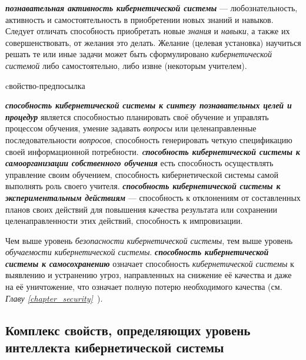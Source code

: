 \textbf{\textit{познавательная активность кибернетической системы}} --- любознательность, активность и самостоятельность в приобретении новых знаний и навыков. Следует отличать способность приобретать новые \textit{знания} и \textit{навыки}, а также их совершенствовать, от желания это делать. Желание (целевая установка) научиться решать те или иные задачи может быть сформулировано \textit{кибернетической системой} либо самостоятельно, либо извне (некоторым учителем).

\begin{SCn}
\begin{scnrelfromlist}{cвойство-предпосылка}
\end{scnrelfromlist}
\end{SCn}

\textbf{\textit{способность кибернетической системы к синтезу познавательных целей и процедур}} является способностью планировать своё обучение и управлять процессом обучения, умение задавать \textit{вопросы} или целенаправленные последовательности \textit{вопросов}, способность генерировать четкую спецификацию своей информационной потребности. \textbf{\textit{cпособность кибернетической системы к самоорганизации собственного обучения}} есть способность осуществлять управление своим обучением, способность кибернетической системы самой выполнять роль своего учителя. \textbf{\textit{способность кибернетической системы к экспериментальным действиям}} --- способность к отклонениям от составленных планов своих действий для повышения качества результата или сохранении целенаправленности этих действий, способность к импровизации.

Чем выше уровень \textit{безопасности кибернетической системы}, тем выше уровень \textit{обучаемости кибернетической системы}.
\textbf{\textit{способность кибернетической системы к самосохранению}} означает способность \textit{кибернетической системы} к выявлению и устранению угроз, направленных на снижение её качества и даже на её уничтожение, что означает полную потерю необходимого качества (см. \textit{Главу \ref{chapter_security}~}).

\subsection{Комплекс свойств, определяющих уровень интеллекта кибернетической системы}
{\label{sec_cyb_syst_intelligence_quality}} 

